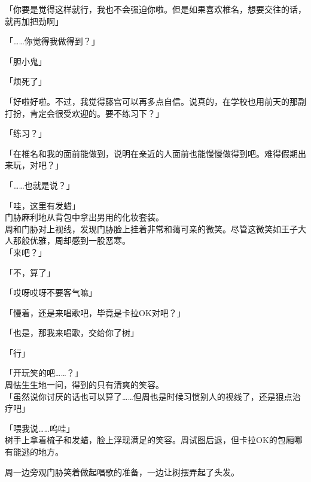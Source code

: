 「你要是觉得这样就行，我也不会强迫你啦。但是如果喜欢椎名，想要交往的话，就再加把劲啊」

「……你觉得我做得到？」

「胆小鬼」

「烦死了」

「好啦好啦。不过，我觉得藤宫可以再多点自信。说真的，在学校也用前天的那副打扮，肯定会很受欢迎的。要不练习下？」

「练习？」

「在椎名和我的面前能做到，说明在亲近的人面前也能慢慢做得到吧。难得假期出来玩，对吧？」

「……也就是说？」

「哇，这里有发蜡」\\

门胁麻利地从背包中拿出男用的化妆套装。\\

周和门胁对上视线，发现门胁脸上挂着非常和蔼可亲的微笑。尽管这微笑如王子大人那般优雅，周却感到一股恶寒。\\

「来吧？」

「不，算了」

「哎呀哎呀不要客气嘛」

「慢着，还是来唱歌吧，毕竟是卡拉OK对吧？」

「也是，那我来唱歌，交给你了树」

「行」

「开玩笑的吧……？」\\

周怯生生地一问，得到的只有清爽的笑容。\\

「虽然说你讨厌的话也可以算了……但周也是时候习惯别人的视线了，还是狠点治疗吧」

「喂我说……呜哇」\\

树手上拿着梳子和发蜡，脸上浮现满足的笑容。周试图后退，但卡拉OK的包厢哪有能逃的地方。

周一边旁观门胁笑着做起唱歌的准备，一边让树摆弄起了头发。
